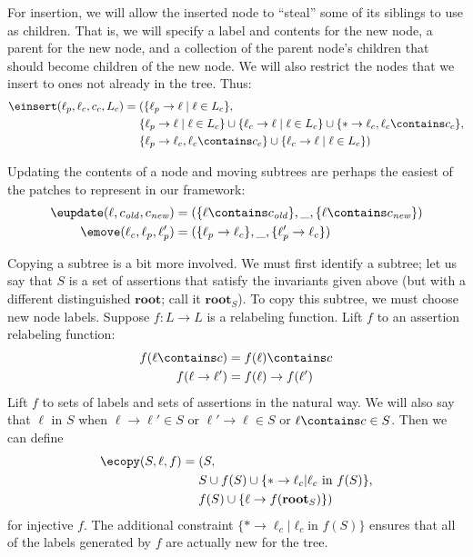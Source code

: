 \documentclass{article}
\newcommand{\mbf}[1]{\ensuremath{\mathbf{#1}}}
\renewcommand{\root}{\mbf{root}\xspace}
\begin{document}
For insertion, we will allow the inserted node to ``steal'' some of its
siblings to use as children. That is, we will specify a label and contents
for the new node, a parent for the new node, and a collection of the parent
node's children that should become children of the new node. We will also
restrict the nodes that we insert to ones not already in the tree. Thus:
\begin{align*}
    \einsert(\ell_p,\ell_c,c_c,L_c) ={}
        & (\{\ell_p \to \ell \mid \ell \in L_c\}, \\
        & \{\ell_p \to \ell \mid \ell \in L_c\} \cup
          \{\ell_c \to \ell \mid \ell \in L_c\} \cup
          \{* \to \ell_c, \ell_c \contains c_c\}, \\
        & \{\ell_p \to \ell_c,\ell_c \contains c_c\}\cup\{\ell_c \to \ell
        \mid \ell \in L_c\})
\end{align*}

Updating the contents of a node and moving subtrees are perhaps the easiest
of the patches to represent in our framework:
\begin{align*}
    \eupdate(\ell,c_{\mathit{old}},c_{\mathit{new}})
        &= (\{\ell \contains c_{\mathit{old}}\},\_,\{\ell \contains
        c_{\mathit{new}}\}) \\
    \emove(\ell_c,\ell_p,\ell_p')
        &= (\{\ell_p \to \ell_c\},\_,\{\ell_p' \to \ell_c\})
\end{align*}

Copying a subtree is a bit more involved. We must first identify a subtree;
let us say that $S$ is a set of assertions that satisfy the invariants given
above (but with a different distinguished \root; call it $\root_S$). To copy
this subtree, we must choose new node labels. Suppose $f:L \to L$ is a
relabeling function. Lift $f$ to an assertion relabeling function:
\begin{align*}
    f(\ell \contains c) &= f(\ell) \contains c \\
    f(\ell \to \ell') &= f(\ell) \to f(\ell')
\end{align*}
Lift $f$ to sets of labels and sets of assertions in the natural way. We
will also say that $\ell\mbox{ in }S$ when $\ell \to \ell' \in S$ or $\ell'
\to \ell \in S$ or $\ell \contains c \in S$. Then we can define
\begin{align*}
    \ecopy(S,\ell,f) ={}
        & (S, \\
        & S \cup f(S) \cup \{* \to \ell_c | \ell_c\mbox{ in }f(S)\}, \\
        & f(S) \cup \{\ell \to f(\root_S)\})
\end{align*}
for injective $f$.  The additional constraint $\{* \to \ell_c | \ell_c\mbox{
in }f(S)\}$ ensures that all of the labels generated by $f$ are actually new
for the tree.
\end{document}

